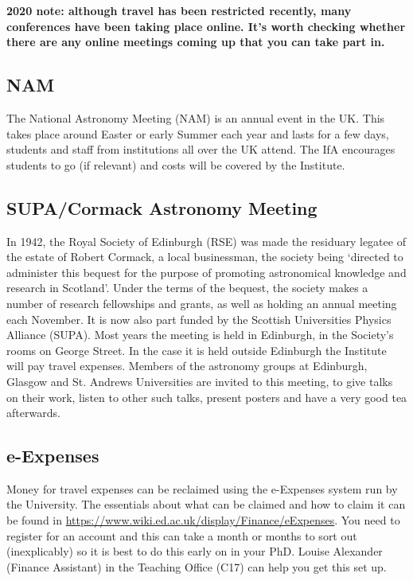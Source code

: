 {\bf 2020 note: although travel has been restricted recently, many conferences have been taking place online. It's worth checking whether there are any online meetings coming up that you can take part in. }

\subsection{NAM}

The National Astronomy Meeting (NAM) is an annual event in the
UK. This takes place around Easter or early Summer each year and lasts for a few days, students and staff from
institutions all over the UK attend. The IfA encourages
students to go (if relevant) and costs will be covered by the Institute.

\subsection{SUPA/Cormack Astronomy Meeting}

In 1942, the Royal Society of
Edinburgh (RSE) was made the residuary legatee of the estate of Robert
Cormack, a local businessman, the society being `directed to
administer this bequest for the purpose of promoting astronomical
knowledge and research in Scotland'. Under the terms of the bequest,
the society makes a number of research fellowships and grants, as well
as holding an annual meeting each November. It is now also part funded by the Scottish Universities Physics Alliance (SUPA). Most years the meeting
is held in Edinburgh, in the Society's rooms on George Street. In the
case it is held outside Edinburgh the
Institute will pay travel expenses. Members of the astronomy groups at
Edinburgh, Glasgow and St. Andrews Universities are invited to this
meeting, to give talks on their work, listen to other such talks, present posters and
have a very good tea afterwards.

\subsection{e-Expenses}

Money for travel expenses can be reclaimed using the e-Expenses system run by the University.
The essentials about what
can be claimed and how to claim it can be found in \url{https://www.wiki.ed.ac.uk/display/Finance/eExpenses}.
You need to register for an account and this can take a month or months to sort out (inexplicably) so it is best to
do this early on in your PhD. Louise Alexander (Finance Assistant) in the Teaching Office (C17) can help you get this set up.

